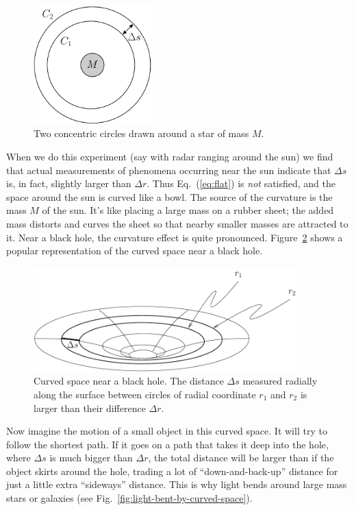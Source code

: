 \begin{figure}[t]
\begin{center}
\includegraphics[width=1.8in]{gravity_and_geometry/concentric.pdf}
\end{center}
\caption{Two concentric circles drawn around a star of mass $M$.}
\label{fig:concentric}
\end{figure}
     
When we do this experiment (say with radar ranging around the sun) we
find that actual measurements of phenomena occurring near the sun
indicate that $\Delta s$ is, in fact, slightly larger than $\Delta r$.
Thus Eq.~(\ref{eq:flat}) is {\em not} satisfied, and the space around
the sun is curved like a bowl.  The source of the curvature is the
mass $M$ of the sun.  It's like placing a large mass on a rubber
sheet; the added mass distorts and curves the sheet so that nearby
smaller masses are attracted to it.  Near a black hole, the curvature
effect is quite pronounced.  Figure~\ref{fig:curved-space} shows a
popular representation of the curved space near a black hole.
     
\begin{figure}[tbp]
\begin{center}
\includegraphics[width=4in]{gravity_and_geometry/black-hole.pdf}
\end{center}
\caption{Curved space near a black hole.  The distance $\Delta s$ measured
radially along the surface between circles of radial coordinate  $r_1$ 
and $r_2$ is larger than their  difference $\Delta r$.}
\label{fig:curved-space}
\end{figure}
     
Now imagine the motion of a small object in this curved space.  It
will try to follow the shortest path.  If it goes on a path that takes
it deep into the hole, where $\Delta s$ is much bigger than $\Delta
r$, the total distance will be larger than if the object skirts around
the hole, trading a lot of ``down-and-back-up'' distance for just a
little extra ``sideways'' distance.  This is why light bends around
large mass stars or galaxies (see
Fig.~\ref{fig:light-bent-by-curved-space}).

